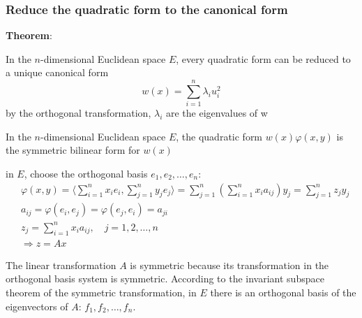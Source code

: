 \subsubsection{Reduce the quadratic form to the canonical form}
\textbf{Theorem}:

In the $n$-dimensional Euclidean space $E$, every quadratic form can be reduced to a unique canonical form 
\[
w(x) = \sum_{i=1}^n \lambda_i u_i^2
\]
by the orthogonal transformation, $\lambda_i$ are the eigenvalues of w

In the $n$-dimensional Euclidean space $E$, the quadratic form $w(x)\varphi(x,y)$ is the symmetric bilinear form for $w(x)$

in $E$, choose the orthogonal basis $e_1, e_2, \ldots, e_n$:
\begin{align*}
    &\varphi(x, y) = \langle\sum_{i=1}^nx_ie_i, \sum_{j=1}^n  y_j e_j\rangle = \sum_{j=1}^n \left(\sum_{i=1}^n x_ia_{ij}\right)y_j = \sum_{j=1}^n z_j y_j\\
    &a_{ij} = \varphi(e_i, e_j) = \varphi(e_j, e_i) = a_{ji}\\
    &z_j = \sum_{i=1}^n x_i a_{ij}, \quad j = 1, 2, \ldots, n\\
    &\Rightarrow z = Ax
\end{align*}

The linear transformation $A$ is symmetric because its transformation in the orthogonal basis system is symmetric. According to the invariant subspace theorem of the symmetric transformation, in $E$ there is an orthogonal basis of the eigenvectors of $A$: $f_1, f_2, \ldots, f_n$.

